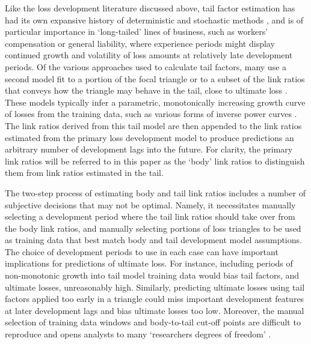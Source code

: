 Like the loss development literature discussed above, 
tail factor estimation has had its own expansive history
of deterministic and stochastic methods \citep{tailfactors2013}, and is of particular
importance in `long-tailed' lines of business, such as workers' compensation or general
liability, where experience periods might display continued growth and 
volatility of loss amounts at relatively late development periods.
Of the various approaches used to calculate tail factors, many 
use a second model fit to a portion
of the focal triangle or to a subset of the link ratios
that conveys how the triangle may behave
in the tail, close to ultimate loss \citep{tailfactors2013}.
These models typically 
infer a parametric, monotonically
increasing growth curve of losses from the training data, 
such as various forms of
inverse power curves \citep[e.g.][]{sherman1984,evans2015,clark2017}.
The link ratios derived from this tail model are then appended to
the link ratios estimated from the primary loss development model
to produce predictions an
arbitrary number of development lags into the future.
For clarity, the primary link ratios will be referred to
in this paper as the `body' link ratios to distinguish them from 
link ratios estimated in the tail.

The two-step process of estimating body and tail link ratios
includes a number of 
subjective decisions that may not be optimal. 
Namely, it necessitates manually selecting a development 
period where the tail link ratios should take over from
the body link ratios, and manually selecting portions of
loss triangles to be used as training data that best match
body and tail development model assumptions.
The choice of development periods to use in each case
can have important implications for predictions of ultimate
loss.
For instance, including periods
of non-monotonic growth into tail model training
data would bias
tail factors, and ultimate losses, unreasonably high. 
Similarly, predicting
ultimate losses using tail factors applied too early
in a triangle
could miss important development features at later
development lags and bias ultimate losses too low. 
Moreover, the manual selection of training data windows
and body-to-tail cut-off points
are difficult to reproduce and
opens analysts to many `researchers degrees of freedom' \citep{simmons2011}.

